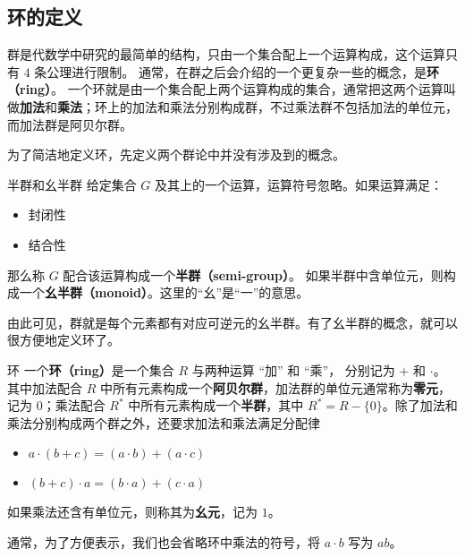 


\subsection{环的定义}
群是代数学中研究的最简单的结构，只由一个集合配上一个运算构成，这个运算只有 $4$ 条公理进行限制。 通常，在群之后会介绍的一个更复杂一些的概念，是\textbf{环（ring）}。 一个环就是由一个集合配上两个运算构成的集合，通常把这两个运算叫做\textbf{加法}和\textbf{乘法}；环上的加法和乘法分别构成群，不过乘法群不包括加法的单位元，而加法群是阿贝尔群。

为了简洁地定义环，先定义两个群论中并没有涉及到的概念。

\begin{definition}{半群和幺半群}\label{def_Ring_1}
给定集合 $G$ 及其上的一个运算，运算符号忽略。如果运算满足：
\begin{itemize}
\item 封闭性
\item 结合性
\end{itemize}
那么称 $G$ 配合该运算构成一个\textbf{半群（semi-group）}。
如果半群中含单位元，则构成一个\textbf{幺半群（monoid）}。这里的“幺”是“一”的意思。
\end{definition}

由此可见，群就是每个元素都有对应可逆元的幺半群。有了幺半群的概念，就可以很方便地定义环了。

\begin{definition}{环}\label{def_Ring_2}
一个\textbf{环（ring）}是一个集合 $R$ 与两种运算 “加” 和 “乘”， 分别记为 $+$ 和 $\cdot$。 其中加法配合 $R$ 中所有元素构成一个\textbf{阿贝尔群}，加法群的单位元通常称为\textbf{零元}，记为 $0$；乘法配合 $R^*$ 中所有元素构成一个\textbf{半群}，其中 $R^*=R-\{0\}$。除了加法和乘法分别构成两个群之外，还要求加法和乘法满足分配律
\begin{itemize}
\item $a \cdot (b + c) = (a \cdot b) + (a \cdot c)$
\item $(b + c) \cdot a = (b \cdot a) + (c \cdot a)$
\end{itemize}
如果乘法还含有单位元，则称其为\textbf{幺元}，记为 $1$。
\end{definition}

通常，为了方便表示，我们也会省略环中乘法的符号，将 $a\cdot b$ 写为 $ab$。

